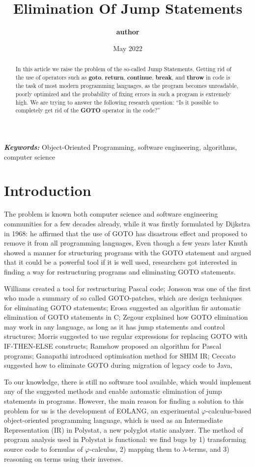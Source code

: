 \documentclass[two column]{article}
\title{\textbf{Elimination Of Jump Statements}}
\author{\textbf{author}}
\date{May 2022}
\providecommand{\keywords}[1]
{
  \small
  \textbf{\textit{Keywords:}} #1
}
\begin{document}
\maketitle

\begin{abstract}
In this article we raise the problem of the so-called Jump Statements. Getting rid of the use of operators such as \textbf{goto}, \textbf{return}, \textbf{continue}, \textbf{break}, and \textbf{throw} in code is the task of most modern programming languages, as the program becomes unreadable, poorly optimized and the probability of fixing errors in such a program is extremely high. 
We are trying to answer the following research question: “Is it possible to completely get rid of the \textbf{GOTO} operator in the code?”

\end{abstract}

\keywords{Object-Oriented Programming, software engineering, algorithms, computer science}


\section{Introduction}
The problem is known both computer science and software engineering communities for a few decades already, while it was firstly formulated by Dijkstra in 1968: he affirmed that the use of GOTO has disastrous effect and proposed to remove it from all programming languages, Even though a few years later Knuth showed a manner for structuring programs with the GOTO statement and argued that it could be a powerful tool if it is well used, researchers got interested in finding a way for restructuring programs and eliminating GOTO statements.

Williams created a tool for restructuring Pascal code; Jonsson was one of the first who made a summary of so called GOTO-patches, which are design techniques for eliminating GOTO statements; Erosa suggested an algorithm fir automatic elimination of GOTO statements in C; Zegour explained how GOTO elimination may work in any language, as long as it has jump statements and control structures; Morris suggested to use regular expressions for replacing GOTO with IF-THEN-ELSE constructs; Ramshow proposed an algorithm for Pascal programs; Ganapathi introduced optimisation method for SHIM IR; Ceccato suggested how to eliminate GOTO during migration of legacy code to Java,

To our knowledge, there is still no software tool available, which would implement any of the suggested methods and enable automatic elimination of jump statements in programs. However, the main reason for finding a solution to this problem for us is the development of EOLANG, an experimental \(\varphi\)-calculus-based object-oriented programming language, which is used as an Intermediate Representation (IR) in Polystat, a new polyglot static analyzer. The method of program analysis used in Polystat is functional: we find bugs by 1) transforming source code to formulas of \(\varphi\)-calculus, 2) mapping them to \(\lambda\)-terms, and 3) reasoning on terms using their inverses.
\end{document}
